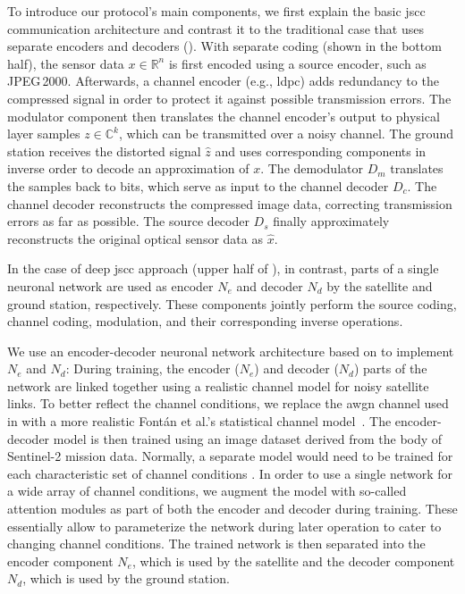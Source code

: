 \documentclass[conference]{IEEEtran}
\newcommand\jpegtwok{JPEG\,2000\xspace}
\newcommand\sentinelii{Sentinel-2\xspace}
\begin{document}
To introduce our protocol's main components, we first explain the basic \ac{jscc} communication architecture and contrast it to the traditional case that uses separate encoders and decoders ().
With separate coding (shown in the bottom half), the sensor data $x \in \mathbb{R}^n$ is first encoded using a source encoder, such as \jpegtwok.
Afterwards, a channel encoder (e.g., \ac{ldpc}) adds redundancy to the compressed signal in order to protect it against possible transmission errors.
The modulator component then translates the channel encoder's output to physical layer samples $z \in \mathbb{C}^k$, which can be transmitted over a noisy channel.
The ground station receives the distorted signal $\hat{z}$ and uses corresponding components in inverse order to decode an approximation of $x$.
The demodulator $D_m$ translates the samples back to bits, which serve as input to the channel decoder $D_c$.
The channel decoder reconstructs the compressed image data, correcting transmission errors as far as possible.
The source decoder $D_s$ finally approximately reconstructs the original optical sensor data as $\hat{x}$.

In the case of deep \ac{jscc} approach (upper half of ), in contrast, parts of a single neuronal network are used as encoder $N_e$ and decoder $N_d$ by the satellite and ground station, respectively.
These components jointly perform the source coding, channel coding, modulation, and their corresponding inverse operations.

We use an encoder-decoder neuronal network architecture based on \cite{satjscc} to implement $N_e$ and $N_d$:
During training, the encoder ($N_e$) and decoder ($N_d$) parts of the network are linked together using a realistic channel model for noisy satellite links.
To better reflect the channel conditions, we replace the \ac{awgn} channel used in \cite{satjscc} with a more realistic Fontán et al.'s statistical channel model~\cite{966585}.
The encoder-decoder model is then trained using an image dataset derived from the body of \sentinelii mission data.
Normally, a separate model would need to be trained for each characteristic set of channel conditions \cite{satjscc}.
In order to use a single network for a wide array of channel conditions, we augment the model with so-called attention modules \cite{wireless-attention-modules} as part of both the encoder and decoder during training.
These essentially allow to parameterize the network during later operation to cater to changing channel conditions.
The trained network is then separated into the encoder component $N_e$, which is used by the satellite and the decoder component $N_d$, which is used by the ground station.
\end{document}
